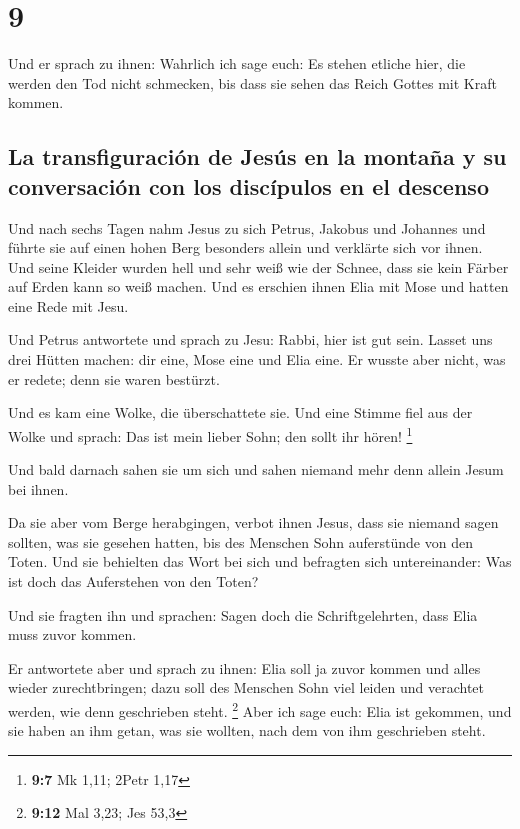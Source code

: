 \hypertarget{section-8}{%
\section{9}\label{section-8}}

 Und er sprach zu ihnen: Wahrlich ich sage euch: Es stehen
etliche hier, die werden den Tod nicht schmecken, bis dass sie sehen das
Reich Gottes mit Kraft kommen.

\hypertarget{la-transfiguraciuxf3n-de-jesuxfas-en-la-montauxf1a-y-su-conversaciuxf3n-con-los-discuxedpulos-en-el-descenso}{%
\subsection{La transfiguración de Jesús en la montaña y su conversación
con los discípulos en el
descenso}\label{la-transfiguraciuxf3n-de-jesuxfas-en-la-montauxf1a-y-su-conversaciuxf3n-con-los-discuxedpulos-en-el-descenso}}

 Und nach sechs Tagen nahm Jesus zu sich Petrus, Jakobus
und Johannes und führte sie auf einen hohen Berg besonders allein und
verklärte sich vor ihnen.  Und seine Kleider wurden hell
und sehr weiß wie der Schnee, dass sie kein Färber auf Erden kann so
weiß machen.  Und es erschien ihnen Elia mit Mose und
hatten eine Rede mit Jesu.

 Und Petrus antwortete und sprach zu Jesu: Rabbi, hier ist
gut sein. Lasset uns drei Hütten machen: dir eine, Mose eine und Elia
eine.  Er wusste aber nicht, was er redete; denn sie waren
bestürzt.

 Und es kam eine Wolke, die überschattete sie. Und eine
Stimme fiel aus der Wolke und sprach: Das ist mein lieber Sohn; den
sollt ihr hören! \footnote{\textbf{9:7} Mk 1,11; 2Petr 1,17}

 Und bald darnach sahen sie um sich und sahen niemand mehr
denn allein Jesum bei ihnen.

 Da sie aber vom Berge herabgingen, verbot ihnen Jesus,
dass sie niemand sagen sollten, was sie gesehen hatten, bis des Menschen
Sohn auferstünde von den Toten.  Und sie behielten das
Wort bei sich und befragten sich untereinander: Was ist doch das
Auferstehen von den Toten?

 Und sie fragten ihn und sprachen: Sagen doch die
Schriftgelehrten, dass Elia muss zuvor kommen.

 Er antwortete aber und sprach zu ihnen: Elia soll ja
zuvor kommen und alles wieder zurechtbringen; dazu soll des Menschen
Sohn viel leiden und verachtet werden, wie denn geschrieben steht.
\footnote{\textbf{9:12} Mal 3,23; Jes 53,3}  Aber ich
sage euch: Elia ist gekommen, und sie haben an ihm getan, was sie
wollten, nach dem von ihm geschrieben steht.

